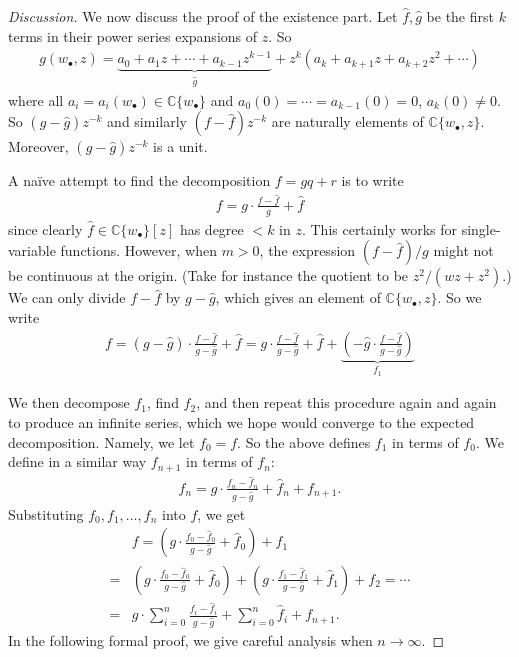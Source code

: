 \documentclass[12pt,b5paper,notitlepage]{report}
\theoremstyle{definition}
\theoremstyle{plain}
\newcommand{\wht}{\widehat}
\newcommand{\blt}{\bullet}
\newcommand{\Cbb}{\mathbb C}
\numberwithin{equation}{section}
\begin{document}
\begin{proof}[Discussion]
We now discuss the proof of the existence part. Let $\wht f,\wht g$ be the first $k$ terms in their power series expansions of $z$. So
\begin{gather*}
g(w_\blt,z)=\underbrace{a_0+a_1z+\cdots+a_{k-1}z^{k-1}}_{\wht g}+z^k(a_k+a_{k+1}z+a_{k+2}z^2+\cdots)
\end{gather*}
where all $a_i=a_i(w_\blt)\in\Cbb\{w_\blt\}$ and $a_0(0)=\cdots=a_{k-1}(0)=0$, $a_k(0)\neq 0$. So $(g-\wht g)z^{-k}$ and similarly $(f-\wht f)z^{-k}$ are naturally elements of $\Cbb\{w_\blt,z\}$. Moreover, $(g-\wht g)z^{-k}$ is a unit.

A na\"ive attempt to find the decomposition $f=gq+r$ is to write
\begin{align*}
f=g\cdot \frac{f-\wht f}{g}+\wht f
\end{align*}
since clearly $\wht f\in\Cbb\{w_\blt\}[z]$ has degree $<k$ in $z$. This certainly works for single-variable functions. However, when $m>0$, the expression $(f-\wht f)/g$ might not be continuous at the origin. (Take for instance the quotient to be $z^2/(wz+z^2)$.) We can only divide $f-\wht f$ by $g-\wht g$, which gives an element of $\Cbb\{w_\blt,z\}$. So we write
\begin{align*}
f=(g-\wht g)\cdot\frac{f-\wht f}{g-\wht g}+\wht f=g\cdot\frac{f-\wht f}{g-\wht g}+\wht f+\underbrace{\left(-\wht g\cdot \frac{f-\wht f}{g-\wht g}\right)}_{f_1}
\end{align*}

We then decompose $f_1$, find $f_2$, and then repeat this procedure again and again to produce an infinite series, which we hope would converge to the expected decomposition. Namely, we let $f_0=f$. So the above defines $f_1$ in terms of $f_0$. We define in a similar way $f_{n+1}$ in terms of $f_n$:
\begin{align}
f_n=g\cdot\frac{f_n-\wht f_n}{g-\wht g}+\wht f_n+f_{n+1}.\label{eq11}
\end{align}  
Substituting $f_0,f_1,\dots,f_n$ into $f$, we get
\begin{align}
&f=\left(g\cdot\frac{f_0-\wht f_0}{g-\wht g}+\wht f_0\right)+f_1\nonumber\\
=&\left(g\cdot\frac{f_0-\wht f_0}{g-\wht g}+\wht f_0\right)+\left(g\cdot\frac{f_1-\wht f_1}{g-\wht g}+\wht f_1\right)+f_2=\cdots\nonumber\\
=&g\cdot\sum_{i=0}^n\frac{f_i-\wht f_i}{g-\wht g}+\sum_{i=0}^n \wht f_i+f_{n+1}.\label{eq14}
\end{align}
In the following formal proof, we give careful analysis when $n\rightarrow\infty$.
\end{proof}
\end{document}
